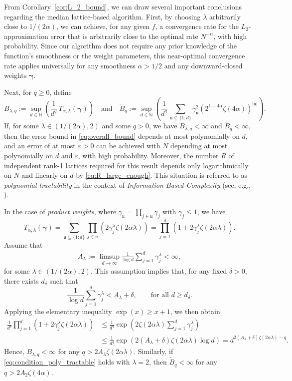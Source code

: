 \documentclass[a4paper,11pt]{article}
\newcommand{\bsgamma}{\boldsymbol{\gamma}}
\newcommand{\NN}{\mathbb{N}}
\newcommand{\fraku}{\mathfrak{u}}
\newcommand{\abs}[1]{\left\vert#1\right\vert}
\begin{document}
From Corollary~\ref{cor:L_2_bound}, we can draw several important conclusions regarding the median lattice-based algorithm. First, by choosing $\lambda$ arbitrarily close to $1/(2\alpha)$, we can achieve, for any given $f$, a convergence rate for the $L_2$-approximation error that is arbitrarily close to the optimal rate $N^{-\alpha}$, with high probability. Since our algorithm does not require any prior knowledge of the function’s smoothness or the weight parameters, this near-optimal convergence rate applies universally for any smoothness $\alpha > 1/2$ and any downward-closed weights $\bsgamma$.

Next, for $q\ge 0$, define
\[
B_{\lambda,q}:= \sup_{d\in\NN} 
\left(\frac{1}{d^q}\, T_{\alpha,\lambda}(\bsgamma)\right)
\quad
\text{and}\quad 
\widetilde{B}_{q}:= \sup_{d\in\NN} 
\left(\frac{1}{d^q}\, \sum_{\fraku \subseteq \{1:d\}} \gamma^2_{\fraku}
\left(2^{1+4\alpha}\zeta(4\alpha)\right)^{\abs{\fraku}}\right).
\]
If, for some $\lambda\in (1/(2\alpha),2)$ and some $q>0$, we have $B_{\lambda,q}<\infty$ and $\widetilde{B}_q<\infty$, then the error bound in \eqref{eq:overall_bound} depends at most polynomially on $d$, and an error of at most $\varepsilon>0$ can be achieved with $N$ depending at most polynomially on $d$ and $\varepsilon$, with high probability. Moreover, the number $R$ of independent rank-1 lattices required for this result depends only logarithmically on $N$ and linearly on $d$ by \eqref{eq:R_large_enough}. This situation is referred to as \textit{polynomial tractability} in the context of \textit{Information-Based Complexity} (see, e.g., \cite{novak2008tractability}).

In the case of \emph{product weights}, where $\gamma_{\fraku}=\prod_{j\in \fraku}\gamma_j$ with $\gamma_j\leq 1$, we have
\[ T_{\alpha,\lambda}(\bsgamma)=\sum_{\fraku\subseteq \{1:d\}} 
\prod_{j\in u}\left( 2\gamma_j^{\lambda} \zeta(2\alpha\lambda)\right)=\prod_{j=1}^{d}\left( 1+2\gamma_j^{\lambda} \zeta(2\alpha\lambda)\right). \]
Assume that 
\begin{align}\label{eq:condition_poly_tractable}
    A_{\lambda} := \limsup_{d\to \infty}\frac{1}{\log d}\sum_{j=1}^{d}\gamma_j^{\lambda}<\infty,
\end{align}
for some $\lambda\in (1/(2\alpha),2)$.
This assumption implies that, for any fixed $\delta>0$, there exists $d_\delta$ such that
\[ \frac{1}{\log d}\sum_{j=1}^{d}\gamma_j^{\lambda}<A_{\lambda}+\delta,\qquad \text{for all $d\ge d_{\delta}$.}\]
Applying the elementary inequality $\exp(x)\ge x+1$, we then obtain
\begin{align*}
    \frac{1}{d^q}\prod_{j=1}^{d}\left( 1+2\gamma_j^{\lambda} \zeta(2\alpha\lambda)\right) & \le \frac{1}{d^q}\exp\left(2\zeta(2\alpha\lambda)\sum_{j=1}^{d}\gamma_j^{\lambda}\right)  \\
    & \le \frac{1}{d^q}\exp\left(2(A_{\lambda}+\delta)\zeta(2\alpha\lambda)\log d \right) =d^{2(A_{\lambda}+\delta)\zeta(2\alpha\lambda)-q}.
\end{align*}
Hence, $B_{\lambda,q}<\infty$ for any $q> 2 A_{\lambda}\zeta(2\alpha\lambda)$. Similarly, if \eqref{eq:condition_poly_tractable} holds with $\lambda=2$, then $\widetilde{B}_{q}<\infty$ for any $q>2A_2\zeta(4\alpha)$.
\end{document}
